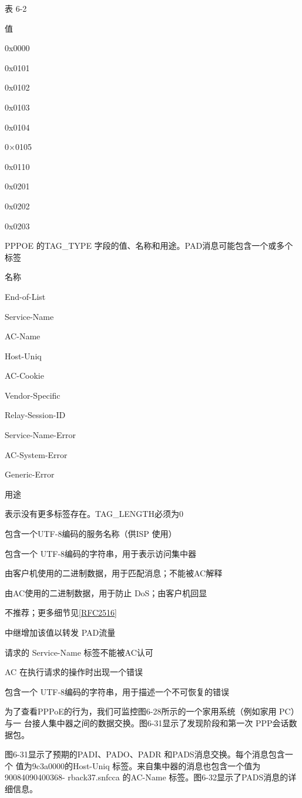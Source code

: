 表 6-2

值

0x0000

0x0101

0x0102

0x0103

0x0104

0×0105

0x0110

0x0201

0x0202

0x0203

PPPOE 的TAG\_TYPE 字段的值、名称和用途。PAD消息可能包含一个或多个标签

名称

End-of-List

Service-Name

AC-Name

Host-Uniq

AC-Cookie

Vendor-Specific

Relay-Session-ID

Service-Name-Error

AC-System-Error

Generic-Error

用途

表示没有更多标签存在。TAG\_LENGTH必须为0

包含一个UTF-8编码的服务名称（供ISP 使用）

包含一个 UTF-8编码的字符串，用于表示访问集中器

由客户机使用的二进制数据，用于匹配消息；不能被AC解释

由AC使用的二进制数据，用于防止 DoS；由客户机回显

不推荐；更多细节见\href{https://www.rfc-editor.org/rfc/rfc2516}{\href{https://www.rfc-editor.org/rfc/rfc2516}{[RFC2516]}}

中继增加该值以转发 PAD流量

请求的 Service-Name 标签不能被AC认可

AC 在执行请求的操作时出现一个错误

包含一个 UTF-8编码的字符串，用于描述一个不可恢复的错误

为了查看PPPoE的行为，我们可监控图6-28所示的一个家用系统（例如家用 PC）与一
台接人集中器之间的数据交换。图6-31显示了发现阶段和第一次 PPP会话数据包。

图6-31显示了预期的PADI、PADO、PADR 和PADS消息交换。每个消息包含一个
值为9c3a0000的Host-Uniq 标签。来自集中器的消息也包含一个值为90084090400368-
rback37.snfcca 的AC-Name 标签。图6-32显示了PADS消息的详细信息。

